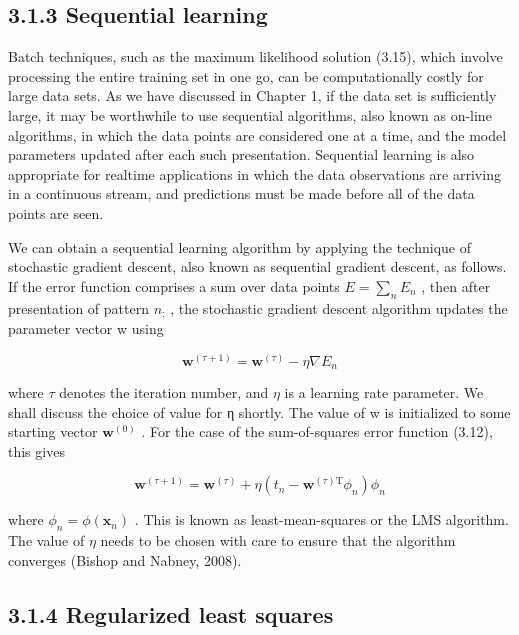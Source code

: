 \documentclass[
  10
]{article}
\begin{document}
\subsection{3.1.3 Sequential learning}\label{sequential-learning}

Batch techniques, such as the maximum likelihood solution (3.15), which
involve processing the entire training set in one go, can be
computationally costly for large data sets. As we have discussed in
Chapter 1, if the data set is sufficiently large, it may be worthwhile
to use sequential algorithms, also known as on-line algorithms, in which
the data points are considered one at a time, and the model parameters
updated after each such presentation. Sequential learning is also
appropriate for realtime applications in which the data observations are
arriving in a continuous stream, and predictions must be made before all
of the data points are seen.

We can obtain a sequential learning algorithm by applying the technique
of stochastic gradient descent, also known as sequential gradient
descent, as follows. If the error function comprises a sum over data
points \(\textstyle E = \sum _ { n } E _ { n }\) , then after
presentation of pattern \(n _ { \mathrm { { ; } } }\) , the stochastic
gradient descent algorithm updates the parameter vector w using

\[
\mathbf {w} ^ {(\tau + 1)} = \mathbf {w} ^ {(\tau)} - \eta \nabla E _ {n}\tag{3.22}
\]

where \(\tau\) denotes the iteration number, and \(\eta\) is a learning
rate parameter. We shall discuss the choice of value for η shortly. The
value of w is initialized to some starting vector
\(\mathbf { w } ^ { ( 0 ) }\) . For the case of the sum-of-squares error
function (3.12), this gives

\[
\mathbf {w} ^ {(\tau + 1)} = \mathbf {w} ^ {(\tau)} + \eta (t _ {n} - \mathbf {w} ^ {(\tau) \mathrm{T}} \phi_ {n}) \phi_ {n}\tag{3.23}
\]

where \(\phi _ { n } = \phi ( \mathbf { x } _ { n } )\) . This is known
as least-mean-squares or the LMS algorithm. The value of \(\eta\) needs
to be chosen with care to ensure that the algorithm converges (Bishop
and Nabney, 2008).

\subsection{3.1.4 Regularized least
squares}\label{regularized-least-squares}
\end{document}
